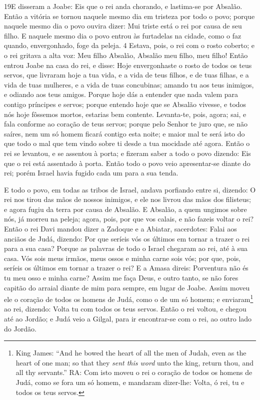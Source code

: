 \lettrine{19} E disseram a Joabe: Eis que o rei anda chorando,
e lastima-se por Absalão. Então a vitória se tornou naquele
mesmo dia em tristeza por todo o povo; porque naquele mesmo dia o
povo ouvira dizer: Mui triste está o rei por causa de seu filho.
E naquele mesmo dia o povo entrou às furtadelas na cidade, como
o faz quando, envergonhado, foge da peleja. 4 Estava, pois, o rei
com o rosto coberto; e o rei gritava a alta voz: Meu filho Absalão,
Absalão meu filho, meu filho! Então entrou Joabe na casa do rei,
e disse: Hoje envergonhaste o rosto de todos os teus servos, que
livraram hoje a tua vida, e a vida de teus filhos, e de tuas filhas,
e a vida de tuas mulheres, e a vida de tuas concubinas; amando
tu aos teus inimigos, e odiando aos teus amigos. Porque hoje dás a
entender que nada valem para contigo príncipes e servos; porque
entendo hoje que se Absalão vivesse, e todos nós hoje fôssemos
mortos, estarias bem contente. Levanta-te, pois, agora; sai, e
fala conforme ao coração de teus servos; porque pelo Senhor te juro
que, se não saíres, nem um só homem ficará contigo esta noite; e
maior mal te será isto do que todo o mal que tem vindo sobre ti
desde a tua mocidade até agora. Então o rei se levantou, e se
assentou à porta; e fizeram saber a todo o povo dizendo: Eis que o
rei está assentado à porta. Então todo o povo veio apresentar-se
diante do rei; porém Israel havia fugido cada um para a sua tenda.

E todo o povo, em todas as tribos de Israel, andava porfiando
entre si, dizendo: O rei nos tirou das mãos de nossos inimigos, e
ele nos livrou das mãos dos filisteus; e agora fugiu da terra por
causa de Absalão. E Absalão, a quem ungimos sobre nós, já
morreu na peleja; agora, pois, por que vos calais, e não fazeis
voltar o rei? Então o rei Davi mandou dizer a Zadoque e a
Abiatar, sacerdotes: Falai aos anciãos de Judá, dizendo: Por que
seríeis vós os últimos em tornar a trazer o rei para a sua casa?
Porque as palavras de todo o Israel chegaram ao rei, até à sua casa.
Vós sois meus irmãos, meus ossos e minha carne sois vós; por
que, pois, seríeis os últimos em tornar a trazer o rei? E a
Amasa direis: Porventura não és tu meu osso e minha carne? Assim me
faça Deus, e outro tanto, se não fores capitão do arraial diante de
mim para sempre, em lugar de Joabe. Assim moveu ele o coração
de todos os homens de Judá, como o de um só homem; e
enviaram\footnote{King James: ``And he bowed the heart of all the
men of Judah, even as the heart of one man; so that they \emph{sent
this word} unto the king, return thou, and all thy servants.'' RA:
Com isto moveu o rei o coração de todos os homens de Judá, como se
fora um só homem, e mandaram dizer-lhe: Volta, ó rei, tu e todos os
teus servos.} ao rei, dizendo: Volta tu com todos os teus servos.
Então o rei voltou, e chegou até ao Jordão; e Judá veio a
Gilgal, para ir encontrar-se com o rei, ao outro lado do Jordão.

